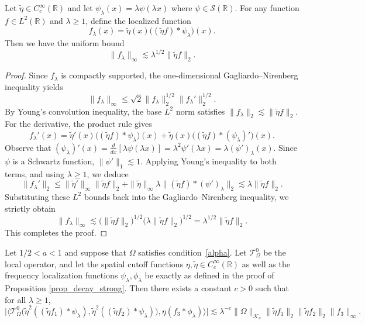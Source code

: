 \documentclass[11pt]{amsart}
\begin{document}
\begin{lemma}\label{lemGN_bound}
	Let $\widetilde\eta \in C_c^\infty(\mathbb R)$ and let $\psi_\lambda(x) = \lambda \psi(\lambda x)$ where $\psi \in \mathcal{S}(\mathbb R)$. For any function $f \in L^2(\mathbb R)$ and $\lambda \ge 1$, define the localized function
	\[
	f_\lambda(x) = \widetilde\eta(x) \big( (\widetilde\eta f) * \psi_\lambda \big)(x).
	\]
	Then we have the uniform bound
	\[
	\|f_\lambda\|_\infty \lesssim \lambda^{1/2} \|\widetilde\eta f\|_2.
	\]
\end{lemma}

\begin{proof}
	Since $f_\lambda$ is compactly supported, the one-dimensional Gagliardo--Nirenberg inequality yields
	\[
	\|f_\lambda\|_\infty \le \sqrt{2} \|f_\lambda\|_2^{1/2} \|f_\lambda'\|_2^{1/2}.
	\]
	By Young's convolution inequality, the base $L^2$ norm satisfies $\|f_\lambda\|_2 \lesssim \|\widetilde\eta f\|_2$.
	For the derivative, the product rule gives
	\[
	f_\lambda'(x) = \widetilde\eta'(x) \big( (\widetilde\eta f) * \psi_\lambda \big)(x) + \widetilde\eta(x) \big( (\widetilde\eta f) * (\psi_\lambda)' \big)(x).
	\]
	Observe that $(\psi_\lambda)'(x) = \frac{d}{dx}[\lambda \psi(\lambda x)] = \lambda^2 \psi'(\lambda x) = \lambda (\psi')_\lambda(x)$.
	Since $\psi$ is a Schwartz function, $\|\psi'\|_1 \lesssim 1$. Applying Young's inequality to both terms, and using $\lambda \ge 1$, we deduce
	\[
	\|f_\lambda'\|_2 \le \|\widetilde\eta'\|_\infty \|\widetilde\eta f\|_2 + \|\widetilde\eta\|_\infty \lambda \|
	(\widetilde\eta f) * (\psi')_\lambda \|_2 \lesssim \lambda \|\widetilde\eta f\|_2.
	\]
	Substituting these $L^2$ bounds back into the Gagliardo--Nirenberg inequality, we strictly obtain
	\[
	\|f_\lambda\|_\infty \lesssim \big( \|\widetilde\eta f\|_2 \big)^{1/2} \big( \lambda \|\widetilde\eta f\|_2 \big)^{1/2} = \lambda^{1/2} \|\widetilde\eta f\|_2.
	\]
	This completes the proof.
\end{proof}

\begin{lemma}\label{lemlocal_oscillatory}
	Let $1/2 < a < 1$ and suppose that $\Omega$ satisfies condition~\eqref{alpha}. Let $\mathcal {T}_\Omega^0$ be the local operator, and let the spatial cutoff functions $\eta, \widetilde{\eta} \in C_c^\infty(\mathbb R)$ as well as the frequency localization functions $\psi_\lambda, \phi_\lambda$ be exactly as defined in the proof of Proposition \ref{prop_decay_strong}. Then there exists a constant $c > 0$ such that for all $\lambda \ge 1$,
	\[
	\Big| \Big\langle \mathcal {T}_\Omega^0\bigl( \widetilde\eta^2((\widetilde\eta f_1)*\psi_\lambda), \widetilde\eta^2((\widetilde\eta f_2)*\psi_\lambda) \bigr), \eta(f_3*\phi_\lambda) \Big\rangle \Big| \lesssim \lambda^{-c}\|\Omega\|_{\mathcal K_a}\|\widetilde\eta f_1\|_2\|\widetilde\eta f_2\|_2\|f_3\|_\infty.
	\]
\end{lemma}
\end{document}

